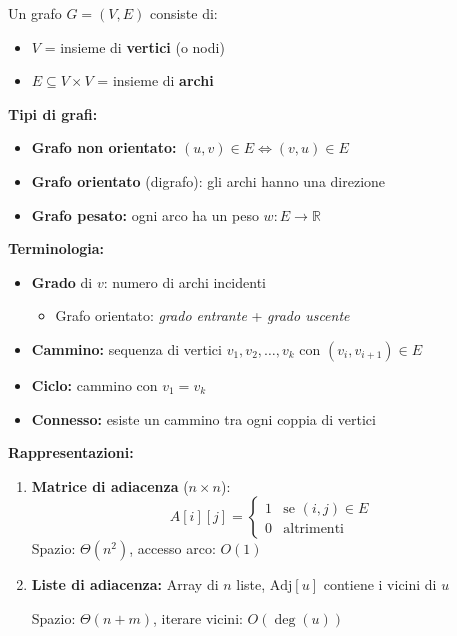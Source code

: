 \begin{definizione}[Grafo]
	Un grafo $G = (V, E)$ consiste di:
	\begin{itemize}
		\item $V$ = insieme di \textbf{vertici} (o nodi)
		\item $E \subseteq V \times V$ = insieme di \textbf{archi}
	\end{itemize}
\end{definizione}

\textbf{Tipi di grafi:}
\begin{itemize}
	\item \textbf{Grafo non orientato:} $(u,v) \in E \Leftrightarrow (v,u) \in E$
	\item \textbf{Grafo orientato} (digrafo): gli archi hanno una direzione
	\item \textbf{Grafo pesato:} ogni arco ha un peso $w: E \to \mathbb{R}$
\end{itemize}

\textbf{Terminologia:}
\begin{itemize}
	\item \textbf{Grado} di $v$: numero di archi incidenti
	\begin{itemize}
		\item Grafo orientato: \textit{grado entrante} + \textit{grado uscente}
	\end{itemize}
	\item \textbf{Cammino:} sequenza di vertici $v_1, v_2, \ldots, v_k$ con $(v_i, v_{i+1}) \in E$
	\item \textbf{Ciclo:} cammino con $v_1 = v_k$
	\item \textbf{Connesso:} esiste un cammino tra ogni coppia di vertici
\end{itemize}

\textbf{Rappresentazioni:}
\begin{enumerate}
	\item \textbf{Matrice di adiacenza} ($n \times n$):
	\[
	A[i][j] = \begin{cases}
		1 & \text{se } (i,j) \in E \\
		0 & \text{altrimenti}
	\end{cases}
	\]
	Spazio: $\Theta(n^2)$, accesso arco: $O(1)$
	
	\item \textbf{Liste di adiacenza:}
	Array di $n$ liste, $\text{Adj}[u]$ contiene i vicini di $u$
	
	Spazio: $\Theta(n + m)$, iterare vicini: $O(\deg(u))$
\end{enumerate}

